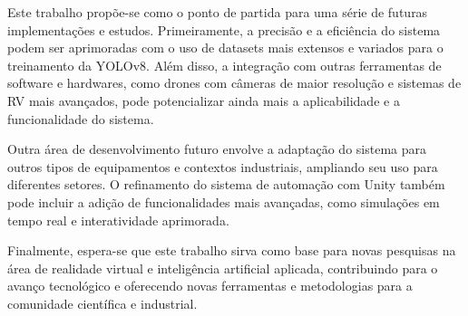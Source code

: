 Este trabalho propõe-se como o ponto de partida para uma série de futuras implementações e estudos. Primeiramente, a precisão e a eficiência do sistema podem ser aprimoradas com o uso de datasets mais extensos e variados para o treinamento da YOLOv8. Além disso, a integração com outras ferramentas de software e hardwares, como drones com câmeras de maior resolução e sistemas de RV mais avançados, pode potencializar ainda mais a aplicabilidade e a funcionalidade do sistema.

Outra área de desenvolvimento futuro envolve a adaptação do sistema para outros tipos de equipamentos e contextos industriais, ampliando seu uso para diferentes setores. O refinamento do sistema de automação com Unity também pode incluir a adição de funcionalidades mais avançadas, como simulações em tempo real e interatividade aprimorada.

Finalmente, espera-se que este trabalho sirva como base para novas pesquisas na área de realidade virtual e inteligência artificial aplicada, contribuindo para o avanço tecnológico e oferecendo novas ferramentas e metodologias para a comunidade científica e industrial.
